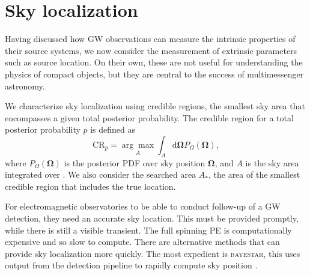 \section{Sky localization}

Having discussed how GW observations can measure the intrinsic properties of their source systems, we now consider the measurement of extrinsic parameters such as source location. On their own, these are not useful for understanding the physics of compact objects, but they are central to the success of multimessenger astronomy.

We characterize sky localization using credible regions, the smallest sky area that encompasses a given total posterior probability. The credible region for a total posterior probability $p$ is defined as
\begin{equation}
\mathrm{CR}_p = \underset{A}{\arg\!\max} \int_A \mathrm{d}\boldsymbol{\Omega} P_{\Omega}(\boldsymbol{\Omega}),
\label{eq:CR}
\end{equation}
where $P_{\Omega}(\boldsymbol{\Omega})$ is the posterior PDF over sky position $\boldsymbol{\Omega}$, and $A$ is the sky area integrated over \citep{Sidery_2014}. We also consider the searched area $A_\ast$, the area of the smallest credible region that includes the true location.

For electromagnetic observatories to be able to conduct follow-up of a GW detection, they need an accurate sky location. This must be provided promptly, while there is still a visible transient. The full spinning PE is computationally expensive and so slow to compute. There are alternative methods that can provide sky localization more quickly. The most expedient is \textsc{bayestar}, this uses output from the detection pipeline to rapidly compute sky position \citep{Singer_2014}.

